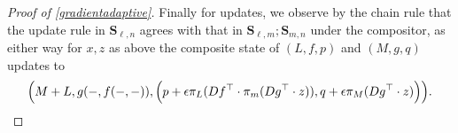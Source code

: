 \documentclass[11pt, one side, article]{memoir}
\theoremstyle{definition}
\theoremstyle{plain}
\newcommand{\Cat}[1]{\mathbf{#1}}%
\newcommand{\0}{\textsf{0}}
\newcommand{\1}{\tn{\textsf{1}}}
\renewcommand{\S}{{\Cat{S}}}
\newcommand{\blp}{\Big{(}}
\newcommand{\brp}{\Big{)}}
\begin{document}
\begin{proof}[Proof of \cref{gradientadaptive}]
Finally for updates, we observe by the chain rule that the update rule in $\S_{\ell,n}$ agrees with that in $\S_{\ell,m};\S_{m,n}$ under the compositor, as either way for $x,z$ as above the composite state of $(L,f,p)$ and $(M,g,q)$ updates to 
$$\blp M+L,g(-,f(-,-)),\blp p + \epsilon \pi_L (Df^\top \cdot \pi_m(Dg^\top \cdot z)),q + \epsilon \pi_M(Dg^\top \cdot z) \brp \brp.$$
\end{proof}


\printbibliography 
\end{document}
